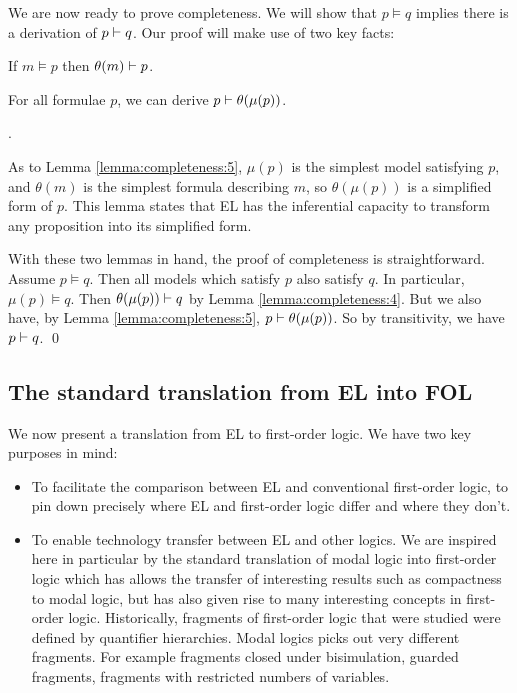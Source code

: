 \NI We are now ready to prove completeness.  We will show that $p
\models q$ implies there is a derivation of $p \vdash q$.  Our proof
will make use of two key facts:

\begin{lemma}\label{lemma:completeness:4}
If $m \models p$ then $\theta(m) \vdash p$.
\end{lemma}

\begin{lemma}\label{lemma:completeness:5}
For all formulae $p$, we can derive $p \vdash \theta(\mu(p))$.
\end{lemma}

.

As to Lemma \ref{lemma:completeness:5}, $\mu(p)$ is the simplest model
satisfying $p$, and $\theta(m)$ is the simplest formula describing
$m$, so $\theta(\mu(p))$ is a simplified form of $p$. This lemma
states that EL has the inferential capacity to transform any
proposition into its simplified form.

With these two lemmas in hand, the proof of completeness is
straightforward.  Assume $p \models q$.  Then all models which satisfy
$p$ also satisfy $q$.  In particular, $\mu(p) \models q$.  Then
$\theta(\mu(p)) \vdash q$ by Lemma \ref{lemma:completeness:4}.  But we
also have, by Lemma \ref{lemma:completeness:5}, $p \vdash
\theta(\mu(p)) $.  So by transitivity, we have $p \vdash q$.  \qed


\subsection{The standard translation from  EL into FOL}

We now present a translation from EL to first-order logic. We have two
key purposes in mind:

\begin{itemize}

\item To facilitate the comparison between EL and conventional
  first-order logic, to pin down precisely where EL and first-order
  logic differ and where they don't.

\item To enable technology transfer between EL and other logics. We
  are inspired here in particular by the standard translation of modal
  logic into first-order logic \cite{BlackburnP:modlog} which has
  allows the transfer of interesting results such as compactness to
  modal logic, but has also given rise to many interesting concepts in
  first-order logic.  Historically, fragments of first-order logic
  that were studied were defined by quantifier hierarchies. Modal
  logics picks out very different fragments. For example fragments
  closed under bisimulation, guarded fragments, fragments with
  restricted numbers of variables.

\end{itemize}


